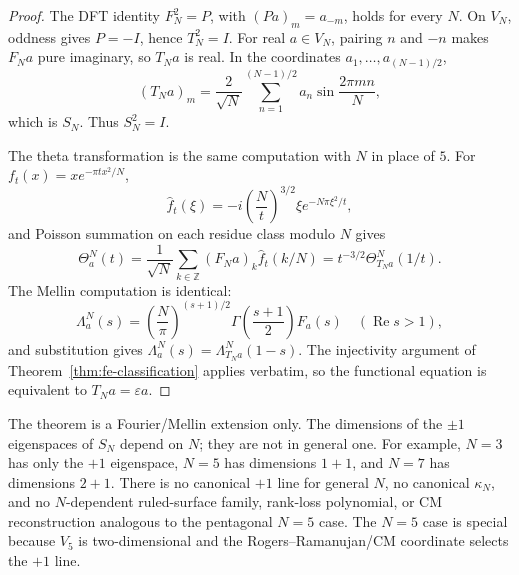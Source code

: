 \begin{proof}
The DFT identity \(F_N^2=P\), with \((Pa)_m=a_{-m}\), holds for every \(N\). On \(V_N\), oddness gives \(P=-I\), hence \(T_N^2=I\). For real \(a\in V_N\), pairing \(n\) and \(-n\) makes \(F_Na\) pure imaginary, so \(T_Na\) is real. In the coordinates \(a_1,\dots,a_{(N-1)/2}\),
\[
(T_Na)_m=\frac2{\sqrt N}\sum_{n=1}^{(N-1)/2}a_n\sin\frac{2\pi mn}{N},
\]
which is \(S_N\). Thus \(S_N^2=I\).

The theta transformation is the same computation with \(N\) in place of \(5\). For \(f_t(x)=xe^{-\pi tx^2/N}\),
\[
\widehat f_t(\xi)=-i\left(\frac Nt\right)^{3/2}\xi e^{-N\pi\xi^2/t},
\]
and Poisson summation on each residue class modulo \(N\) gives
\[
\Theta_a^N(t)
=\frac1{\sqrt N}\sum_{k\in\mathbb Z}(F_Na)_k\widehat f_t(k/N)
=t^{-3/2}\Theta_{T_Na}^N(1/t).
\]
The Mellin computation is identical:
\[
\Lambda_a^N(s)=\left(\frac N\pi\right)^{(s+1)/2}
\Gamma\!\left(\frac{s+1}{2}\right)F_a(s)
\quad(\operatorname{Re}s>1),
\]
and substitution gives \(\Lambda_a^N(s)=\Lambda_{T_Na}^N(1-s)\). The injectivity argument of Theorem~\ref{thm:fe-classification} applies verbatim, so the functional equation is equivalent to \(T_Na=\varepsilon a\).
\end{proof}

\begin{remark}\label{rem:odd-N-scope}
The theorem is a Fourier/Mellin extension only. The dimensions of the \(\pm1\) eigenspaces of \(S_N\) depend on \(N\); they are not in general one. For example, \(N=3\) has only the \(+1\) eigenspace, \(N=5\) has dimensions \(1+1\), and \(N=7\) has dimensions \(2+1\). There is no canonical \(+1\) line for general \(N\), no canonical \(\kappa_N\), and no \(N\)-dependent ruled-surface family, rank-loss polynomial, or CM reconstruction analogous to the pentagonal \(N=5\) case. The \(N=5\) case is special because \(V_5\) is two-dimensional and the Rogers--Ramanujan/CM coordinate selects the \(+1\) line.
\end{remark}

